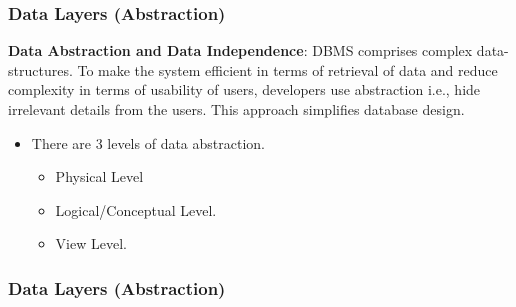 \begin{frame}
	\frametitle{Data Layers (Abstraction)}
	\begin{definition}
		\textbf{Data Abstraction and Data Independence}: DBMS comprises complex data-structures. To make the system efficient in terms of retrieval of data and reduce complexity in terms of usability of users, developers use abstraction i.e., hide irrelevant details from the users. This approach simplifies database design.
	\end{definition}	
	\begin{itemize}[<+->]
		\item There are 3 levels of data abstraction.
		\begin{itemize}[<+->]
			\item Physical Level
			\item Logical/Conceptual Level.
			\item View Level.
		\end{itemize}
	\end{itemize}	
\end{frame}
\begin{frame}
\frametitle{Data Layers (Abstraction)}

\end{frame}
\VideoClassification
